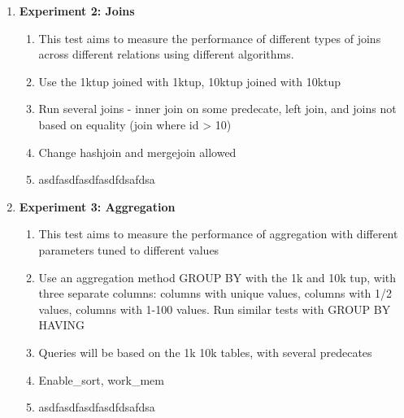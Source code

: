 \documentclass[11pt,letterpaper]{article}
\begin{document}
\begin{enumerate}
\begin{enumerate}
	\item \textbf{Experiment 2: Joins}
	\begin{enumerate}
	 	\item This test aims to measure the performance of different types of joins across different relations using different algorithms.
	 	\item Use the 1ktup joined with 1ktup, 10ktup joined with 10ktup
	 	\item Run several joins - inner join on some predecate, left join, and joins not based on equality (join where id > 10)
	 	\item Change hashjoin and mergejoin allowed
	 	\item asdfasdfasdfasdfdsafdsa
	\end{enumerate}

 	\item \textbf{Experiment 3: Aggregation}
 	\begin{enumerate}
 		\item This test aims to measure the performance of aggregation with different parameters tuned to different values
 		\item Use an aggregation method GROUP BY with the 1k and 10k tup, with three separate columns: columns with unique values, columns with 1/2 values, columns with 1-100 values.  Run similar tests with GROUP BY HAVING
 		\item Queries will be based on the 1k 10k tables, with several predecates 
 		\item Enable\_sort, work\_mem
 		\item asdfasdfasdfasdfdsafdsa
 	\end{enumerate}


\end{enumerate}
\end{enumerate}
\end{document}
